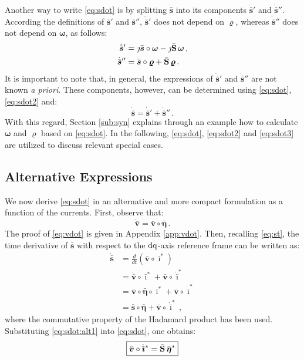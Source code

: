 \documentclass[journal, twocolumn, letter]{IEEEtran}
\newcommand{\bfg}[1]{\boldsymbol{#1}}
\newcommand{\bfp}[1]{\bar{\boldsymbol{#1}}}
\newcommand{\bfb}[1]{\boldsymbol{\rm #1}}
\newcommand{\ii}{\imath}
\newcommand{\jj}{\jmath}
\newcommand{\ivec}{\bfp \ii}
\newcommand{\idot}{\dot{\bar{\bfg \ii}}}
\newcommand{\vvec}{\bfp v}
\newcommand{\vdot}{\dot{\bfp v}}
\newcommand{\svec}{\bar{\bfg s}}
\newcommand{\sdot}{\dot{\bar{\bfg s}}}
\newcommand{\evec}{\bar{\bfg \eta}}
\newcommand{\rhovec}{\bfg \varrho}
\newcommand{\wvec}{\bfg \omega}
\newcommand{\Sbus}{\bar{\bfb S}}
\begin{document}
Another way to write \eqref{eq:sdot} is by splitting $\sdot$ into its
components $\sdot'$ and $\sdot''$.  According the definitions of
$\svec'$ and $\svec''$, $\sdot'$ does not depend on $\rhovec$, whereas
$\sdot''$ does not depend on $\wvec$, as follows: 
\begin{equation}
  \label{eq:sdot2}
  \begin{aligned}
    \sdot' &= \jj \svec \circ \wvec - \jj \Sbus \, \wvec \, , \\
    \sdot'' &= \svec \circ \rhovec + \Sbus \, \rhovec \, .
  \end{aligned}
\end{equation}
It is important to note that, in general, the expressions of $\sdot'$
and $\sdot''$ are not known \textit{a priori}.  These components,
however, can be determined using \eqref{eq:sdot}, \eqref{eq:sdot2}
and: 
\begin{equation}
  \label{eq:sdot3}
  \sdot = \sdot' + \sdot'' \, .
\end{equation}
With this regard, Section \ref{sub:syn} explains through an example
how to calculate $\wvec$ and $\rhovec$ based on \eqref{eq:sdot}.
 In the following, \eqref{eq:sdot}, \eqref{eq:sdot2} and
\eqref{eq:sdot3} are utilized to discuss relevant special cases.

\subsection{Alternative Expressions}
\label{sub:alternative}

We now derive \eqref{eq:sdot} in an alternative and more compact
formulation as a function of the currents.  First, observe that:
\begin{equation}
  \label{eq:vdot}
  \vdot = \vvec \circ \evec \, .
\end{equation}
The proof of \eqref{eq:vdot} is given in Appendix \ref{app:vdot}.
Then, recalling \eqref{eq:st}, the time derivative of $\svec$ with
respect to the $\rm dq$-axis reference frame can be written
as:
\begin{equation}
  \label{eq:sdot:alt1}
  \begin{aligned}
    \sdot &= \frac{d}{dt} (\vvec \circ \ivec^*) \\
    &= \vdot \circ \ivec^* + \vvec \circ \idot^* \\
    &= \vvec \circ \evec \circ \ivec^* + \vvec \circ \idot^* \\ 
    &= \svec \circ \evec + \vvec \circ \idot^* \, ,
  \end{aligned}
\end{equation}
where the commutative property of the Hadamard product
has been used. 
Substituting \eqref{eq:sdot:alt1} into \eqref{eq:sdot}, one obtains:
\begin{equation}
  \label{eq:sdot:alt2}
  \boxed{\vvec \circ \idot^* = \Sbus \, \evec^*}
\end{equation}
\end{document}
